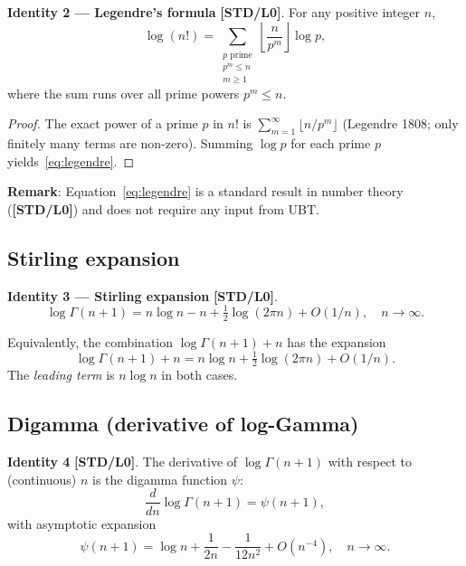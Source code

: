 \documentclass[12pt,a4paper]{article}
\theoremstyle{definition}
\theoremstyle{remark}
\newcommand{\STDLZ}{\textcolor{gray!70!black}{\textbf{[STD/L0]}}}
\begin{document}
\begin{resultbox}
\textbf{Identity 2 — Legendre's formula} \STDLZ{}.  For any positive integer $n$,
\begin{equation}
  \log(n!) = \sum_{\substack{p \text{ prime} \\ p^m \leq n \\ m \geq 1}}
             \left\lfloor \frac{n}{p^m} \right\rfloor \log p,
  \label{eq:legendre}
\end{equation}
where the sum runs over all prime powers $p^m \leq n$.
\end{resultbox}

\begin{proof}
The exact power of a prime $p$ in $n!$ is $\sum_{m=1}^{\infty}\lfloor n/p^m \rfloor$
(Legendre 1808; only finitely many terms are non-zero).  Summing $\log p$ for each
prime $p$ yields~\eqref{eq:legendre}.
\end{proof}

\textbf{Remark}: Equation~\eqref{eq:legendre} is a standard result in number theory
(\STDLZ{}) and does not require any input from UBT.

\subsection{Stirling expansion}
\label{sec:stirling}

\begin{resultbox}
\textbf{Identity 3 — Stirling expansion} \STDLZ{}.
\begin{equation}
  \log\Gamma(n+1) = n\log n - n + \tfrac{1}{2}\log(2\pi n) + O(1/n),
  \quad n \to \infty.
  \label{eq:stirling}
\end{equation}
\end{resultbox}

Equivalently, the combination $\log\Gamma(n+1) + n$ has the expansion
\begin{equation}
  \log\Gamma(n+1) + n = n\log n + \tfrac{1}{2}\log(2\pi n) + O(1/n).
  \label{eq:logGammaPlusn}
\end{equation}
The \emph{leading term} is $n\log n$ in both cases.

\subsection{Digamma (derivative of log-Gamma)}
\label{sec:digamma}

\begin{resultbox}
\textbf{Identity 4} \STDLZ{}.  The derivative of $\log\Gamma(n+1)$ with respect to
(continuous) $n$ is the digamma function $\psi$:
\begin{equation}
  \frac{d}{dn}\log\Gamma(n+1) = \psi(n+1),
  \label{eq:digamma_def}
\end{equation}
with asymptotic expansion
\begin{equation}
  \psi(n+1) = \log n + \frac{1}{2n} - \frac{1}{12n^2} + O(n^{-4}),
  \quad n \to \infty.
  \label{eq:digamma_asymp}
\end{equation}
\end{resultbox}
\end{document}
